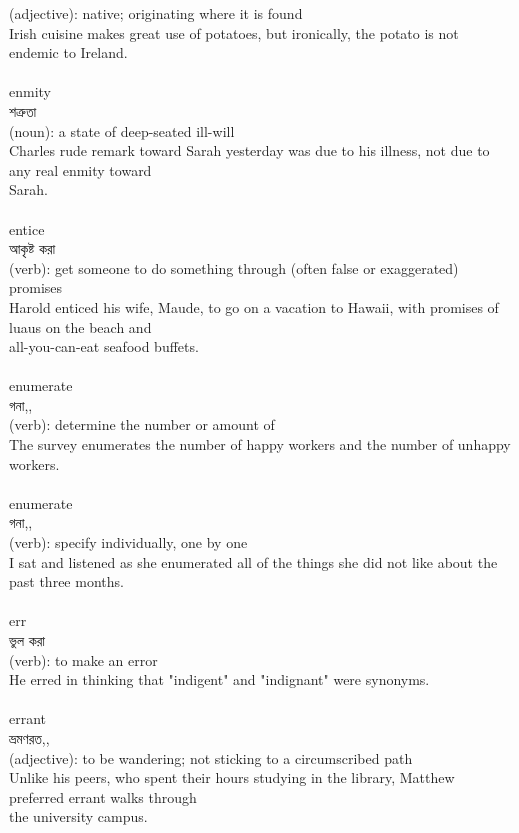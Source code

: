 \documentclass{article}
\begin{document}
{(adjective): native; originating where it is found\\Irish cuisine makes great use of potatoes, but ironically, the potato is not endemic to Ireland.\\}\\
{enmity}\\
{শত্রুতা}\\
{(noun): a state of deep-seated ill-will\\Charles rude remark toward Sarah yesterday was due to his illness, not due to any real enmity toward\\Sarah.\\}\\
{entice}\\
{আকৃষ্ট করা}\\
{(verb): get someone to do something through (often false or exaggerated) promises\\Harold enticed his wife, Maude, to go on a vacation to Hawaii, with promises of luaus on the beach and\\all-you-can-eat seafood buffets.\\}\\
{enumerate}\\
{গনা,,}\\
{(verb): determine the number or amount of\\The survey enumerates the number of happy workers and the number of unhappy workers.\\}\\
{enumerate}\\
{গনা,,}\\
{(verb): specify individually, one by one\\I sat and listened as she enumerated all of the things she did not like about the past three months.\\}\\
{err}\\
{ভুল করা}\\
{(verb): to make an error\\He erred in thinking that "indigent" and "indignant" were synonyms.\\}\\
{errant}\\
{ভ্রমণরত,,}\\
{(adjective): to be wandering; not sticking to a circumscribed path\\Unlike his peers, who spent their hours studying in the library, Matthew preferred errant walks through\\the university campus.\\}\\
\end{document}
